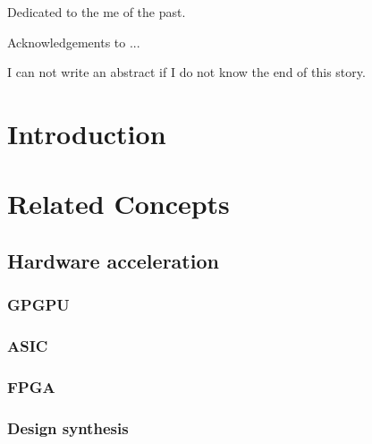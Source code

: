\documentclass{iccmemoria}
\author{Erik Regla}
\date{month, year}
\begin{document}
\maketitle

\begin{dedicatory}
Dedicated to the me of the past. %
\end{dedicatory}

\begin{acknowledgment}
Acknowledgements to ...
\end{acknowledgment}

\tableofcontents
\listoffigures
\listoftables

\begin{resumen}
I can not write an abstract if I do not know the end of this story.
\end{resumen}



\chapter{Introduction}
  

\chapter{Related Concepts} %
  
  
  
  \section{Hardware acceleration}
    \subsection{GPGPU}
    \subsection{ASIC}
    \subsection{FPGA}
    \subsection{Design synthesis}
\end{document}
